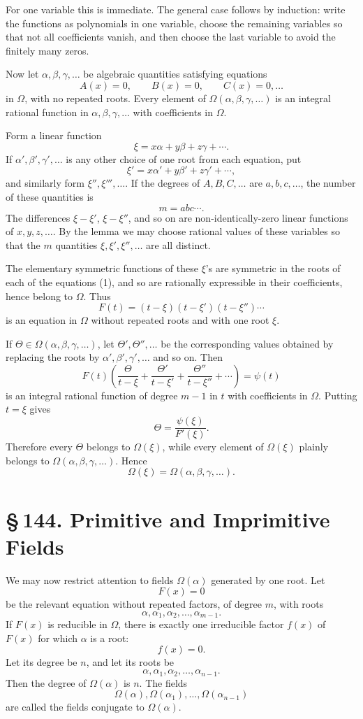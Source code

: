 \documentclass[11pt]{article}
\providecommand{\sect}[2]{\section*{\S\,#1. #2}}
\begin{document}
For one variable this is immediate. The general case follows by induction: write the functions as polynomials in one variable, choose the remaining variables so that not all coefficients vanish, and then choose the last variable to avoid the finitely many zeros.

Now let $\alpha,\beta,\gamma,\ldots$ be algebraic quantities satisfying equations
\[
\tag{1}
        A(x)=0,\qquad B(x)=0,\qquad C(x)=0,\ldots
\]
in $\Omega$, with no repeated roots. Every element of $\Omega(\alpha,\beta,\gamma,\ldots)$ is an integral rational function in $\alpha,\beta,\gamma,\ldots$ with coefficients in $\Omega$.

Form a linear function
\[
        \xi=x\alpha+y\beta+z\gamma+\cdots.
\]
If $\alpha',\beta',\gamma',\ldots$ is any other choice of one root from each equation, put
\[
        \xi'=x\alpha'+y\beta'+z\gamma'+\cdots,
\]
and similarly form $\xi'',\xi''',\ldots$. If the degrees of $A,B,C,\ldots$ are $a,b,c,\ldots$, the number of these quantities is
\[
        m=abc\cdots.
\]
The differences $\xi-\xi'$, $\xi-\xi''$, and so on are non-identically-zero linear functions of $x,y,z,\ldots$. By the lemma we may choose rational values of these variables so that the $m$ quantities $\xi,\xi',\xi'',\ldots$ are all distinct.

The elementary symmetric functions of these $\xi$'s are symmetric in the roots of each of the equations (1), and so are rationally expressible in their coefficients, hence belong to $\Omega$. Thus
\[
\tag{2}
        F(t)=(t-\xi)(t-\xi')(t-\xi'')\cdots
\]
is an equation in $\Omega$ without repeated roots and with one root $\xi$.

If $\Theta\in\Omega(\alpha,\beta,\gamma,\ldots)$, let $\Theta',\Theta'',\ldots$ be the corresponding values obtained by replacing the roots by $\alpha',\beta',\gamma',\ldots$ and so on. Then
\[
        F(t)\left(
        \frac{\Theta}{t-\xi}+
        \frac{\Theta'}{t-\xi'}+
        \frac{\Theta''}{t-\xi''}+\cdots
        \right)=\psi(t)
\]
is an integral rational function of degree $m-1$ in $t$ with coefficients in $\Omega$. Putting $t=\xi$ gives
\[
\tag{3}
        \Theta=\frac{\psi(\xi)}{F'(\xi)}.
\]
Therefore every $\Theta$ belongs to $\Omega(\xi)$, while every element of $\Omega(\xi)$ plainly belongs to $\Omega(\alpha,\beta,\gamma,\ldots)$. Hence
\[
        \Omega(\xi)=\Omega(\alpha,\beta,\gamma,\ldots).
\]

\sect{144}{Primitive and Imprimitive Fields}

We may now restrict attention to fields $\Omega(\alpha)$ generated by one root. Let
\[
\tag{1}
        F(x)=0
\]
be the relevant equation without repeated factors, of degree $m$, with roots
\[
\tag{2}
        \alpha,\alpha_1,\alpha_2,\ldots,\alpha_{m-1}.
\]
If $F(x)$ is reducible in $\Omega$, there is exactly one irreducible factor $f(x)$ of $F(x)$ for which $\alpha$ is a root:
\[
\tag{3}
        f(x)=0.
\]
Let its degree be $n$, and let its roots be
\[
\tag{4}
        \alpha,\alpha_1,\alpha_2,\ldots,\alpha_{n-1}.
\]
Then the degree of $\Omega(\alpha)$ is $n$. The fields
\[
\tag{5}
        \Omega(\alpha),\Omega(\alpha_1),\ldots,\Omega(\alpha_{n-1})
\]
are called the fields conjugate to $\Omega(\alpha)$.
\end{document}
